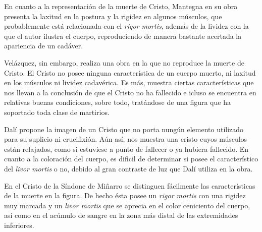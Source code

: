 En cuanto a la representación de la muerte de Cristo, Mantegna en su obra presenta la laxitud en la postura y la rigidez en algunos músculos, que probablemente está relacionada con el \textit{rigor mortis}, además de la lividez con la que el autor ilustra el cuerpo, reproduciendo de manera bastante acertada la apariencia de un cadáver.

Velázquez, sin embargo, realiza una obra en la que no reproduce la muerte de Cristo. El Cristo no posee ninguna característica de un cuerpo muerto, ni laxitud en los músculos ni lividez cadavérica. Es más, muestra ciertas características que nos llevan a la conclusión de que el Cristo no ha fallecido e icluso se encuentra en relativas buenas condiciones, sobre todo, tratándose de una figura que ha soportado toda clase de martirios.

Dalí propone la imagen de un Cristo que no porta nungún elemento utilizado para su suplicio ni crucifixión. Aún así, nos muestra una cristo cuyos músculos están relajados, como si estuviese a punto de fallecer o ya hubiera fallecido. En cuanto a la coloración del cuerpo, es dificil de determinar si posee el característico del \textit{livor mortis} o no, debido al gran contraste de luz que Dalí utiliza en la obra.

En el Cristo de la Síndone de Miñarro se distinguen fácilmente las características de la muerte en la figura. De hecho ésta posee un \textit{rigor mortis} con una rigidez muy marcada y un \textit{livor mortis} que se aprecia en el color ceniciento del cuerpo, así como en el acúmulo de sangre en la zona más distal de las extremidades inferiores.